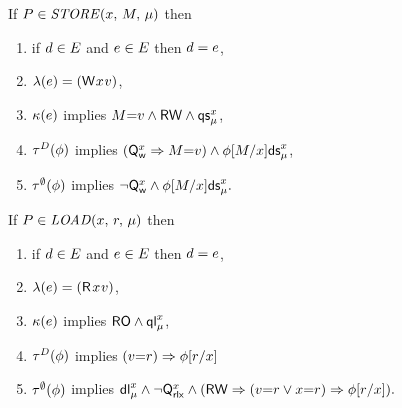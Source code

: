 \noindent
If $\aPS \in \sSTORE[\amode]{\aLoc}{\aExp}$ then
\begin{enumerate}
\item if $\bEv\in\aEvs$ and $\aEv\in\aEvs$ then $\bEv=\aEv$,
\item $\labelingAct(\aEv) = \DWP{\aLoc}{\aVal}$,
\item 
  $\labelingForm(\aEv)$ implies
  \begin{math}
    \aExp{=}\aVal
    \land \RW
    \land \QS{\aLoc}{\amode}
  \end{math},
\item
  $\aTr[\bEvs](\aForm)$ implies 
  \begin{math}
    (\Qw{\aLoc} \limplies \aExp{=}\aVal)
    \land \DS{\aLoc}{\amode}{\aForm[\aExp/{\aLoc}]}
  \end{math},
\item 
  $\aTr[\emptyset](\aForm)$ implies 
  \begin{math}
    \lnot\Qw{\aLoc}
    \land \DS{\aLoc}{\amode}{\aForm[\aExp/{\aLoc}]}.
  \end{math}
\end{enumerate}

\noindent
If $\aPS \in \sLOAD[\amode]{\aLoc}{\aReg}$ then
\begin{enumerate}
\item if $\bEv\in\aEvs$ and $\aEv\in\aEvs$ then $\bEv=\aEv$,
\item $\labelingAct(\aEv) = \DRP{\aLoc}{\aVal}$,
\item $\labelingForm(\aEv)$ implies
  \begin{math}
    \RO
    \land \QL{\aLoc}{\amode}
  \end{math},
\item
  $\aTr[\bEvs](\aForm)$ implies
  \begin{math}
    (\aVal{=}\aReg)
    \limplies \aForm[\aReg/{\aLoc}]
  \end{math}
\item 
  $\aTr[\emptyset](\aForm)$ implies
  \begin{math}
    \DL{\aLoc}{\amode}
    \land \lnot\Qx{\aLoc}
    \land 
    (\RW
    \limplies (\aVal{=}\aReg\lor\aLoc{=}\aReg) 
    \limplies \aForm[\aReg/{\aLoc}]
    ).
  \end{math}
\end{enumerate}  
